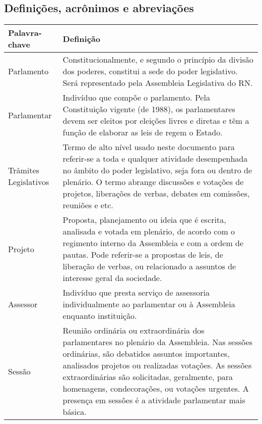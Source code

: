 \documentclass[12pt, a4paper]{article}
\begin{document}
        \subsection{Definições, acrônimos e abreviações}
            \begin{longtabu}{X[-1] | X}
                \hline
                \textbf{Palavra-chave} &
                \textbf{Definição}
                \\ \hline

                Parlamento &
                Constitucionalmente, e segundo o princípio da divisão dos
                poderes, constitui a sede do poder legislativo. Será
                representado pela Assembleia Legislativa do RN.
                \\ \hline

                Parlamentar &
                Indivíduo que compõe o parlamento. Pela Constituição vigente
                (de 1988), os parlamentares devem ser eleitos por eleições
                livres e diretas e têm a função de elaborar as leis de regem o
                Estado.
                \\ \hline

                Trâmites Legislativos &
                Termo de alto nível usado neste documento para referir-se a
                toda e qualquer atividade desempenhada no âmbito do poder
                legislativo, seja fora ou dentro de plenário. O termo abrange
                discussões e votações de projetos, liberações de verbas,
                debates em comissões, reuniões e etc.
                \\ \hline

                Projeto &
                Proposta, planejamento ou ideia que é escrita, analisada e
                votada em plenário, de acordo com o regimento interno da
                Assembleia e com a ordem de pautas. Pode referir-se a propostas
                de leis, de liberação de verbas, ou relacionado a assuntos de
                interesse geral da sociedade.
                \\ \hline

                Assessor &
                Indivíduo que presta serviço de assessoria individualmente ao
                parlamentar ou à Assembleia enquanto instituição.
                \\ \hline

                Sessão &
                Reunião ordinária ou extraordinária dos parlamentares no
                plenário da Assembleia. Nas sessões ordinárias, são debatidos
                assuntos importantes, analisados projetos ou realizadas
                votações. As sessões extraordinárias são solicitadas,
                geralmente, para homenagens, condecorações, ou votações
                urgentes. A presença em sessões é a atividade parlamentar mais
                básica.
                \\ \hline


\end{longtabu}
\end{document}
